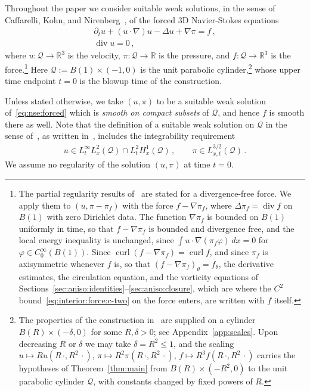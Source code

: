 \documentclass[11pt,reqno]{amsproc}
\numberwithin{equation}{section}
\theoremstyle{remark}
\newcommand{\p}{\partial}
\newcommand{\RR}{\mathbb R}
\newcommand{\curl}{\operatorname{curl}}
\renewcommand{\div}{\operatorname{div}}
\begin{document}
Throughout the paper we consider suitable weak solutions, in the sense of Caffarelli, Kohn, and Nirenberg~\cite{CKN}, of the forced 3D Navier-Stokes equations
\begin{subequations}
\label{eq:nse:forced}
\begin{align}
\p_tu+(u\cdot\nabla)u-\Delta u+\nabla\pi=f\,,
\\
\div u=0\,,
\end{align}
\end{subequations}
where $u\colon\mathcal Q\to\RR^3$ is the velocity, $\pi\colon\mathcal Q\to\RR$ is the pressure, and $f\colon\mathcal Q\to\RR^3$ is the force.\footnote{\label{foot:aniso:pressure}The partial regularity results of~\cite{CKN} are stated for a divergence-free force. We apply them to $(u,\pi-\pi_f)$ with the force $f-\nabla\pi_f$, where $\Delta\pi_f=\div f$ on $B(1)$ with zero Dirichlet data. The function $\nabla\pi_f$ is bounded on $B(1)$ uniformly in time, so that $f-\nabla\pi_f$ is bounded and divergence free, and the local energy inequality is unchanged, since $\int u\cdot\nabla(\pi_f\varphi)\,dx=0$ for $\varphi\in C^\infty_0(B(1))$. Since $\curl(f-\nabla\pi_f)=\curl f$, and since $\pi_f$ is axisymmetric whenever $f$ is, so that $(f-\nabla\pi_f)_\theta=f_\theta$, the derivative estimates, the circulation equation, and the vorticity equations of Sections~\ref{sec:aniso:identities}--\ref{sec:aniso:closure}, which are where the $C^2$ bound~\eqref{eq:interior:force:c-two} on the force enters, are written with $f$ itself.} Here $\mathcal Q:=B(1)\times(-1,0)$ is the unit parabolic cylinder,\footnote{The properties of the construction in~\cite{OpenAIManuscript} are supplied on a cylinder $B(R)\times(-\delta,0)$ for some $R,\delta>0$; see Appendix~\ref{app:scales}. Upon decreasing $R$ or $\delta$ we may take $\delta=R^2\le1$, and the scaling $u\mapsto Ru(R\,\cdot,R^2\,\cdot)$, $\pi\mapsto R^2\pi(R\,\cdot,R^2\,\cdot)$, $f\mapsto R^3f(R\,\cdot,R^2\,\cdot)$ carries the hypotheses of Theorem~\ref{thm:main} from $B(R)\times(-R^2,0)$ to the unit parabolic cylinder $\mathcal Q$, with constants changed by fixed powers of $R$.} whose upper time endpoint $t=0$ is the blowup time of the construction.

Unless stated otherwise, we take $(u,\pi)$ to be a suitable weak solution of~\eqref{eq:nse:forced} which is \emph{smooth on compact subsets} of $\mathcal Q$, and hence $f$ is smooth there as well. Note that the definition of a suitable weak solution on $\mathcal Q$ in the sense of~\cite{CKN}, as written in~\cite{Lin98,LadyzhenskayaSeregin99}, includes the integrability requirement
\begin{align}
u\in L^\infty_tL^2_x(\mathcal Q)\cap L^2_tH^1_x(\mathcal Q)
\,,\qquad
\pi\in L^{3/2}_{x,t}(\mathcal Q)
\,.
\label{eq:interior:energy:class}
\end{align}
We assume no regularity of the solution $(u,\pi)$ at time $t=0$.
\end{document}
